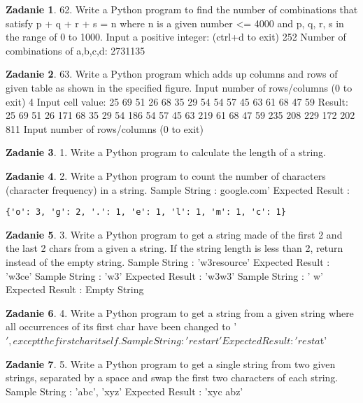 \documentclass[11pt]{article}
\theoremstyle{definition}
\newtheorem{zadanie}{Zadanie}
\begin{document}
\begin{zadanie}
62. Write a Python program to find the number of combinations that satisfy p + q + r + s = n where n is a given number <= 4000 and p, q, r, s in the range of 0 to 1000.
Input a positive integer: (ctrl+d to exit)
252
Number of combinations of a,b,c,d: 2731135
\end{zadanie}

\begin{zadanie}
63. Write a Python program which adds up columns and rows of given table as shown in the specified figure.
Input number of rows/columns (0 to exit)
4
Input cell value:
25 69 51 26
68 35 29 54
54 57 45 63
61 68 47 59
Result:
25 69 51 26 171
68 35 29 54 186
54 57 45 63 219
61 68 47 59 235
208 229 172 202 811
Input number of rows/columns (0 to exit)
\end{zadanie}
\begin{zadanie}
1. Write a Python program to calculate the length of a string.
\end{zadanie}

\begin{zadanie}
2. Write a Python program to count the number of characters (character frequency) in a string.
Sample String : google.com'
Expected Result :
\begin{verbatim}
{'o': 3, 'g': 2, '.': 1, 'e': 1, 'l': 1, 'm': 1, 'c': 1}
\end{verbatim}
\end{zadanie}

\begin{zadanie}
3. Write a Python program to get a string made of the first 2 and the last 2 chars from a given a string. If the string length is less than 2, return instead of the empty string.
Sample String : 'w3resource'
Expected Result : 'w3ce'
Sample String : 'w3'
Expected Result : 'w3w3'
Sample String : ' w'
Expected Result : Empty String
\end{zadanie}

\begin{zadanie}
4. Write a Python program to get a string from a given string where all occurrences of its first char have been changed to '$', except the first char itself.
	Sample String : 'restart'
	Expected Result : 'resta$t'
\end{zadanie}

\begin{zadanie}
5. Write a Python program to get a single string from two given strings, separated by a space and swap the first two characters of each string.
Sample String : 'abc', 'xyz'
Expected Result : 'xyc abz'
\end{zadanie}
\end{document}
